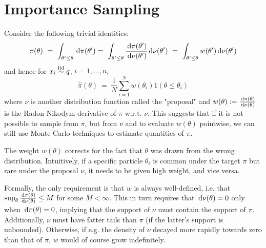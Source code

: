 \section{Importance Sampling}

Consider the following trivial identities:
\begin{equation*}
\pi(\theta) ~ = ~ \int_{\theta' \leq \theta} \, \textrm{d} \pi(\theta') 
	= ~ \int_{\theta' \leq \theta} \frac{\, \textrm{d} \pi(\theta')}{\, \textrm{d} \nu(\theta')} \, \textrm{d} \nu(\theta') ~ = ~ \int_{\theta' \leq \theta} w(\theta') \, \textrm{d} \nu(\theta')
\end{equation*}
and hence for $x_i \stackrel{\textrm{iid}}{\sim} q$, $i=1,...,n$,
\begin{equation*}
\hat{\pi}(\theta) ~ = ~ \frac{1}{N} \sum_{i=1}^N w(\theta_i) 1(\theta \leq \theta_i)
\end{equation*}
where $\nu$ is another distribution function called the "proposal" and $w(\theta) := \frac{\, \textrm{d} \pi(\theta)}{\, \textrm{d} \nu(\theta)}$ is the Radon-Nikodym derivative of $\pi$ w.r.t. $\nu$. This suggests that if it is not possible to sample from $\pi$, but from $\nu$ and to evaluate $w(\theta)$ pointwise, we can still use Monte Carlo techniques to estimate quantities of $\pi$.

The weight $w(\theta)$ corrects for the fact that $\theta$ was drawn from the wrong distribution. Intuitively, if a specific particle $\theta_i$ is common under the target $\pi$ but rare under the proposal $\nu$, it needs to be given high weight, and vice versa.

Formally, the only requirement is that $w$ is always well-defined, i.e. that $\sup_\theta \frac{\, \textrm{d} \pi(\theta)}{\, \textrm{d} \nu(\theta)} \leq M$ for some $M < \infty$. This in turn requires that $\, \textrm{d} \nu(\theta) = 0$ only when $\, \textrm{d} \pi(\theta) = 0$, implying that the support of $\nu$ must contain the support of $\pi$. Additionally, $\nu$ must have fatter tails than $\pi$ (if the latter's support is unbounded). Otherwise, if e.g. the density of $\nu$ decayed more rapidly towards zero than that of $\pi$, $w$ would of course grow indefinitely.

